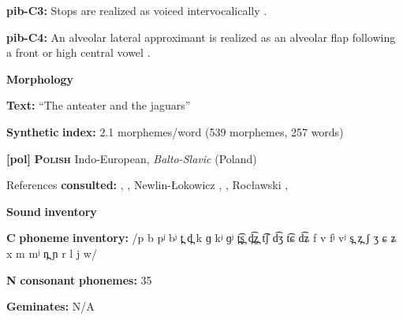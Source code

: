 \documentclass[output=paper]{langsci/langscibook}
\begin{document}
\begin{styleBody}
\textbf{pib-C3:} Stops are realized as voiced intervocalically \citep[17]{Hanson2010}.
\end{styleBody}

\begin{styleBody}
\textbf{pib-C4:} An alveolar lateral approximant is realized as an alveolar flap following a front or high central vowel \citep[24]{Hanson2010}.
\end{styleBody}

\begin{styleBody}
\textbf{Morphology}
\end{styleBody}

\begin{styleBody}
\textbf{Text:} “The anteater and the jaguars” \citep[379-386]{Hanson2010}
\end{styleBody}

\begin{styleBody}
\textbf{Synthetic} \textbf{index:} 2.1 morphemes/word (539 morphemes, 257 words)
\end{styleBody}

\begin{styleBody}
\textbf{[pol]}   \textbf{\textsc{Polish}}  Indo-European, \textit{Balto-Slavic} (Poland)
\end{styleBody}

\begin{styleBody}
References \textbf{consulted:} \citet{Gussman2007}, \citet{Jassem2003}, Newlin-Łokowicz , \citet{Nowak2006}, Rocławski , \citet{Zydorowicz2010}
\end{styleBody}

\begin{styleBody}
\textbf{Sound} \textbf{inventory}
\end{styleBody}

\begin{styleBody}
\textbf{C} \textbf{phoneme} \textbf{inventory:} /p b pʲ bʲ t̪ d̪ k ɡ kʲ ɡʲ t̪͡s̪ d̪͡z̪ t͡ʃ d͡ʒ t͡ɕ d͡ʑ f v fʲ vʲ s̪ z̪ ʃ ʒ ɕ ʑ x m mʲ n̪ ɲ r l j w/
\end{styleBody}

\begin{styleBody}
\textbf{N} \textbf{consonant} \textbf{phonemes:} 35
\end{styleBody}

\begin{styleBody}
\textbf{Geminates:} N/A
\end{styleBody}
\end{document}
